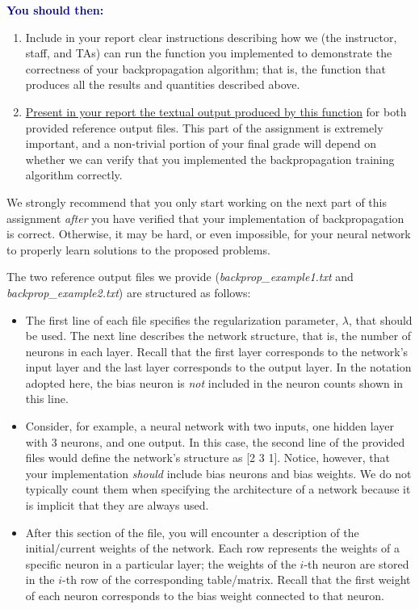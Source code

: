 \documentclass{article}
\begin{document}
\noindent \textcolor{darkblue}{\textbf{You should then:}} 

\begin{enumerate}
    \renewcommand{\labelenumi}{(\roman{enumi})}
    \item Include in your report clear instructions describing how we (the instructor, staff, and TAs) can run the function you implemented to demonstrate the correctness of your backpropagation algorithm; that is, the function that produces all the results and quantities described above.
    \item \ul{Present in your report the textual output produced by this function} for both provided reference output files. This part of the assignment is extremely important, and a non-trivial portion of your final grade will depend on whether we can verify that you implemented the backpropagation training algorithm correctly.
\end{enumerate}

\noindent We strongly recommend that you only start working on the next part of this assignment \textit{after} you have verified that your implementation of backpropagation is correct. Otherwise, it may be hard, or even impossible, for your neural network to properly learn solutions to the proposed problems.
\vspace{0.5cm}

\noindent The two reference output files we provide (\emph{backprop\_example1.txt} and \emph{backprop\_example2.txt}) are structured as follows: 

\begin{itemize}
\item The first line of each file specifies the regularization parameter, $\lambda$, that should be used. The next line describes the network structure, that is, the number of neurons in each layer. Recall that the first layer corresponds to the network's input layer and the last layer corresponds to the output layer. In the notation adopted here, the bias neuron is \textit{not} included in the neuron counts shown in this line.

\item Consider, for example, a neural network with two inputs, one hidden layer with 3 neurons, and one output. In this case, the second line of the provided files would define the network's structure as [2 3 1]. Notice, however, that your implementation \textit{should} include bias neurons and bias weights. We do not typically count them when specifying the architecture of a network because it is implicit that they are always used.

\item After this section of the file, you will encounter a description of the initial/current weights of the network. Each row represents the weights of a specific neuron in a particular layer; the weights of the $i$-th neuron are stored in the $i$-th row of the corresponding table/matrix. Recall that the first weight of each neuron corresponds to the bias weight connected to that neuron. 
\end{itemize}
\end{document}
